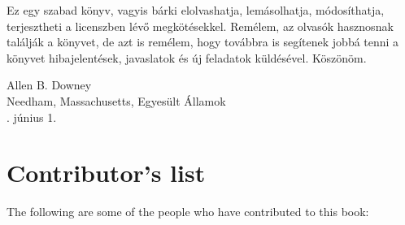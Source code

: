 \documentclass{book}
\begin{document}
Ez egy szabad könyv, vagyis bárki elolvashatja, lemásolhatja, módosíthatja,
terjesztheti a licenszben lévő megkötésekkel. Remélem, az olvasók
hasznosnak találják a könyvet, de azt is remélem, hogy továbbra is
segítenek jobbá tenni a könyvet hibajelentések, javaslatok és
új feladatok küldésével. Köszönöm.

\vspace{0.3in}

\noindent Allen B. Downey \\
\noindent Needham, Massachusetts, Egyesült Államok \\
. június 1. \\


\section*{Contributor's list}

The following are some of the people who have contributed to this
book:
\end{document}
